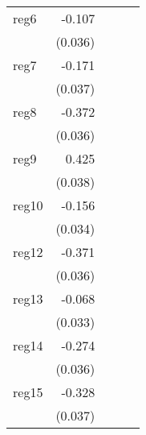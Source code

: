 {\begin{longtable}{l*{4}{D{.}{.}{-1}}}
\addlinespace
reg6        &      -0.107\sym{**} &                     &                     &                     \\
            &     (0.036)         &                     &                     &                     \\
\addlinespace
reg7        &      -0.171\sym{***}&                     &                     &                     \\
            &     (0.037)         &                     &                     &                     \\
\addlinespace
reg8        &      -0.372\sym{***}&                     &                     &                     \\
            &     (0.036)         &                     &                     &                     \\
\addlinespace
reg9        &       0.425\sym{***}&                     &                     &                     \\
            &     (0.038)         &                     &                     &                     \\
\addlinespace
reg10       &      -0.156\sym{***}&                     &                     &                     \\
            &     (0.034)         &                     &                     &                     \\
\addlinespace
reg12       &      -0.371\sym{***}&                     &                     &                     \\
            &     (0.036)         &                     &                     &                     \\
\addlinespace
reg13       &      -0.068\sym{*}  &                     &                     &                     \\
            &     (0.033)         &                     &                     &                     \\
\addlinespace
reg14       &      -0.274\sym{***}&                     &                     &                     \\
            &     (0.036)         &                     &                     &                     \\
\addlinespace
reg15       &      -0.328\sym{***}&                     &                     &                     \\
            &     (0.037)         &                     &                     &                     \\

\end{longtable}}
